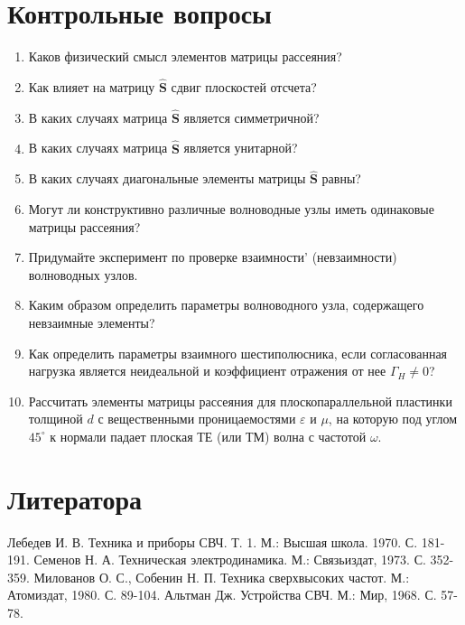 ﻿\documentclass[a4paper,11pt]{article}
\begin{document}
\section{Контрольные вопросы}

\begin{enumerate}
	\item  Каков физический смысл элементов матрицы рассеяния?
	\item Как влияет на матрицу $\hat{\mathbf{S}}$ сдвиг плоскостей отсчета?
	\item В каких случаях матрица $\hat{\mathbf{S}}$ является симметричной?
	\item В каких случаях матрица $\hat{\mathbf{S}}$ является унитарной?
	\item В каких случаях диагональные элементы матрицы $\hat{\mathbf{S}}$ равны?
	\item Могут ли конструктивно различные волноводные узлы иметь одинаковые матрицы рассеяния?
	\item Придумайте эксперимент по проверке взаимности' (невзаимности) волноводных узлов.
	\item Каким образом определить параметры волноводного узла, содержащего невзаимные элементы?
	\item Как определить параметры взаимного шестиполюсника, если согласованная нагрузка является неидеальной и коэффициент отражения от нее $\Gamma_H\ne 0$?
	\item Рассчитать элементы матрицы рассеяния для плоскопараллельной пластинки толщиной $d$ с вещественными проницаемостями $\varepsilon$ и $\mu$, на которую под углом $45^\circ$ к нормали падает плоская ТЕ (или ТМ) волна с частотой $\omega$.
\end{enumerate}


\section*{Литератора} 
 
\begin{thebibliography}{}
      Лебедев И. В. Техника и приборы СВЧ. Т. 1. М.: Высшая школа. 1970. С. 181-191.
     Семенов Н. А. Техническая электродинамика. М.: Связьиздат, 1973. С. 352-359.
      Милованов О. С., Собенин Н. П. Техника сверхвысоких частот. М.: Атомиздат, 1980. С. 89-104.
     Альтман Дж. Устройства СВЧ. М.: Мир, 1968. С. 57-78.
\end{thebibliography}
\end{document}

